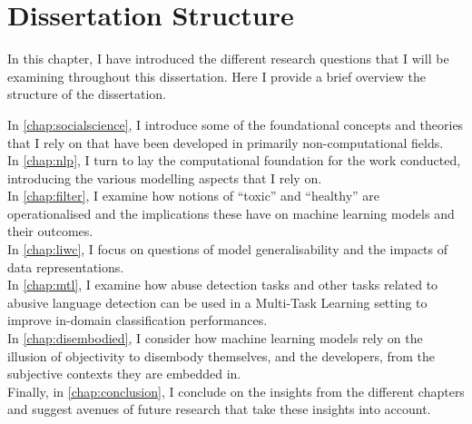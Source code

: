 \section{Dissertation Structure}\label{sec:structure}

In this chapter, I have introduced the different research questions that I will be examining throughout this dissertation. Here I provide a brief overview the structure of the dissertation.

In \cref{chap:socialscience}, I introduce some of the foundational concepts and theories that I rely on that have been developed in primarily non-computational fields.\\
In \cref{chap:nlp}, I turn to lay the computational foundation for the work conducted, introducing the various modelling aspects that I rely on.\\
In \cref{chap:filter}, I examine how notions of ``toxic'' and ``healthy'' are operationalised and the implications these have on machine learning models and their outcomes.\\
In \cref{chap:liwc}, I focus on questions of model generalisability and the impacts of data representations.\\
In \cref{chap:mtl}, I examine how abuse detection tasks and other tasks related to abusive language detection can be used in a Multi-Task Learning setting to improve in-domain classification performances.\\
In \cref{chap:disembodied}, I consider how machine learning models rely on the illusion of objectivity to disembody themselves, and the developers, from the subjective contexts they are embedded in.\\
Finally, in \cref{chap:conclusion}, I conclude on the insights from the different chapters and suggest avenues of future research that take these insights into account.


